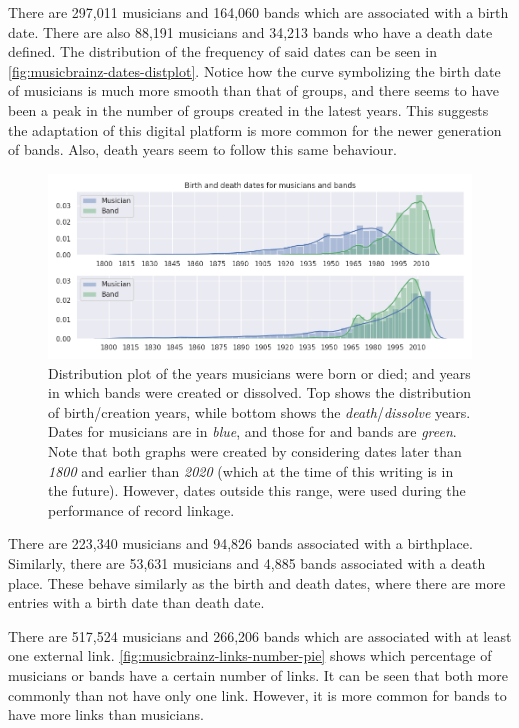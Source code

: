 \documentclass[epsfig,a4paper,11pt,titlepage,twoside,openany]{book}
\begin{document}
There are 297,011 musicians and 164,060 bands which are associated with a birth date. There are also 88,191 musicians and 34,213 bands who have a death date defined. The distribution of the frequency of said dates can be seen in \autoref{fig:musicbrainz-dates-distplot}. Notice how the curve symbolizing the birth date of musicians is much more smooth than that of groups, and there seems to have been a peak in the number of groups created in the latest years. This suggests the adaptation of this digital platform is more common for the newer generation of bands. Also, death years seem to follow this same behaviour.

\begin{figure}[H]
  \centering \includegraphics[width=\textwidth]{musicbrainz_birth_death_dates_distplot} 
  \caption{Distribution plot of the years musicians were born or died; and years in which bands were created or dissolved. Top shows the distribution of birth/creation years, while bottom shows the \textit{death}/\textit{dissolve} years. Dates for musicians are in \textit{blue}, and those for and bands are \textit{green}. Note that both graphs were created by considering dates later than \textit{1800} and earlier than \textit{2020} (which at the time of this writing is in the future). However, dates outside this range, were used during the performance of record linkage.}
  \label{fig:musicbrainz-dates-distplot}
\end{figure}

There are 223,340 musicians and 94,826 bands associated with a birthplace. Similarly, there are 53,631 musicians and 4,885 bands associated with a death place. These behave similarly as the birth and death dates, where there are more entries with a birth date than death date.

There are 517,524 musicians and 266,206 bands which are associated with at least one external link. \autoref{fig:musicbrainz-links-number-pie} shows which percentage of musicians or bands have a certain number of links. It can be seen that both more commonly than not have only one link. However, it is more common for bands to have more links than musicians. 
\end{document}
